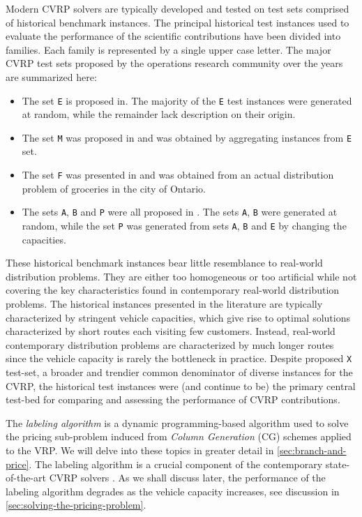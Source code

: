 Modern CVRP solvers are typically developed and tested on test sets comprised of historical benchmark instances.
The principal historical test instances used to evaluate the performance of the scientific contributions have been divided into families.
Each family is represented by a single upper case letter.
The major CVRP test sets proposed by the operations research community over the years are summarized here:
\begin{itemize}
	\setlength{\itemsep}{0pt}
	\setlength{\parskip}{0pt}

	\item The set \texttt{E} is proposed in\textcite{dantzig1959, christofides1969, gaskell1967bases, gillett1974heuristic}.
	      The majority of the \texttt{E} test instances were generated at random, while the remainder lack description on their origin.
	\item The set \texttt{M} was proposed in \textcite{christofides1979vehicle} and was obtained by aggregating instances from \texttt{E} set.
	\item The set \texttt{F} was presented in \textcite{fisher1994} and was obtained from an actual distribution problem of groceries in the city of Ontario.
	\item The sets \texttt{A}, \texttt{B} and \texttt{P} were all proposed in \textcite{augerat1995}.
	      The sets \texttt{A}, \texttt{B} were generated at random, while the set \texttt{P} was generated from sets \texttt{A}, \texttt{B} and \texttt{E} by changing the capacities.
\end{itemize}
These historical benchmark instances bear little resemblance to real-world distribution problems.
They are either too homogeneous or too artificial while not covering the key characteristics found in contemporary real-world distribution problems.
The historical instances presented in the literature are typically characterized by stringent vehicle capacities, which give rise to optimal solutions characterized by short routes each visiting few customers.
Instead, real-world contemporary distribution problems are characterized by much longer routes since the vehicle capacity is rarely the bottleneck in practice.
Despite \textcite{uchoa2017} proposed \texttt{X} test-set, a broader and trendier common denominator of diverse instances for the CVRP, the historical test instances were (and continue to be) the primary central test-bed for comparing and assessing the performance of CVRP contributions.

The \textit{labeling algorithm} is a dynamic programming-based algorithm used to solve the pricing sub-problem induced from \textit{Column Generation} (CG) schemes applied to the VRP.
We will delve into these topics in greater detail in \cref{sec:branch-and-price}.
The labeling algorithm is a crucial component of the contemporary state-of-the-art CVRP solvers \parencite{gutierrez-jarpa2010, archetti2011, bettinelli2011, contardo2014, contardo2015, pecin2017new, pecin2017improved, pessoa2020generic}.
As we shall discuss later, the performance of the labeling algorithm degrades as the vehicle capacity increases, see discussion in \cref{sec:solving-the-pricing-problem}.

